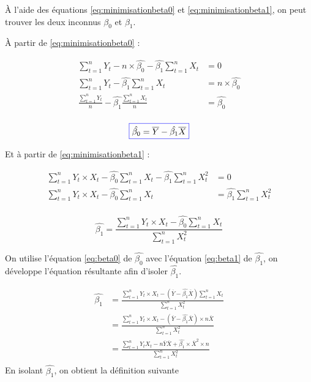 \documentclass[11pt,french]{report}
\begin{document}
À l'aide des équations \ref{eq:minimisationbeta0} et \ref{eq:minimisationbeta1}, on peut trouver les deux inconnus $\beta_0$ et $\beta_1$.

À partir de \ref{eq:minimisationbeta0} :

\begin{align*}
\sum_{t=1}^n Y_t - n \times \hat{\beta_0} - \hat{\beta_1} \sum_{t=1}^n X_t &= 0 \\
\sum_{t=1}^n Y_t - \hat{\beta_1} \sum_{t=1}^n X_t &=  n \times \hat{\beta_0} \\
\frac{\sum_{t=1}^n Y_t}{n} - \hat{\beta_1} \frac{\sum_{t=1}^n X_t}{n} &=  \hat{\beta_0} \\
\end{align*}

\begin{equation}
\label{eq:beta0}
\color{blue}
\boxed{\color{black}
\hat{\beta_0} = \overline{Y} - \hat{\beta_1} \overline{X}}
\end{equation}

Et à partir de \ref{eq:minimisationbeta1} :

\begin{align*}
\sum_{t=1}^n Y_t \times X_t - \hat{\beta_0} \sum_{t=1}^n X_t - \hat{\beta_1} \sum_{t=1}^n X_t^2 &= 0 \\
\sum_{t=1}^n Y_t \times X_t - \hat{\beta_0} \sum_{t=1}^n X_t &=  \hat{\beta_1} \sum_{t=1}^n X_t^2 \\
\end{align*}

\begin{equation}
\label{eq:beta0}
\hat{\beta_1} =  \frac{\sum_{t=1}^n Y_t \times X_t - \hat{\beta_0} \sum_{t=1}^n X_t}{\sum_{t=1}^n X_t^2}
\end{equation}

On utilise l'équation \ref{eq:beta0} de $\hat{\beta_0}$ avec l'équation \ref{eq:beta1} de $\hat{\beta_1}$, on développe l'équation résultante afin d'isoler $\hat{\beta_1}$.

\begin{align*}
\hat{\beta_1} &= \frac{\sum_{t=1}^n Y_t \times X_t - (\overline{Y} - \hat{\beta_1}\overline{X})\sum_{t=1}^n X_t}{\sum_{t=1}^n X_t^2} \\
&= \frac{\sum_{t=1}^n Y_t \times X_t - (\overline{Y} - \hat{\beta_1}\overline{X})\times n \overline{X}}{\sum_{t=1}^n X_t^2} \\
&= \frac{\sum_{t=1}^n Y_t X_t - n\overline{Y}\overline{X} + \hat{\beta_1}\times \overline{X}^2 \times n}{\sum_{t=1}^n X_t^2} \\
\end{align*}
En isolant $\hat{\beta_1}$, on obtient la définition suivante
\end{document}
